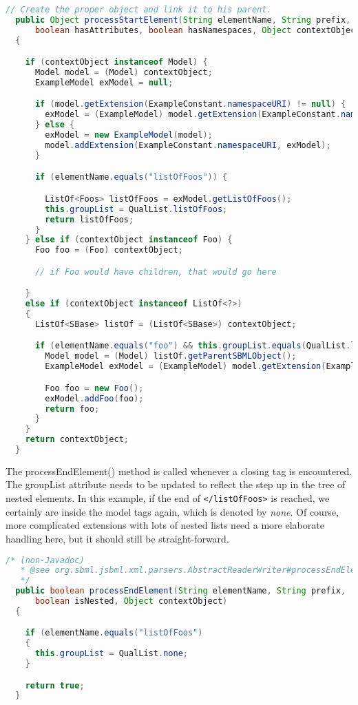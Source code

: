 \begin{lstlisting}[language=Java,caption={Extension parser: \texttt{processStartElement()}},label={lst:ModelExtParserStartElement}]
  // Create the proper object and link it to his parent.
  public Object processStartElement(String elementName, String prefix,
      boolean hasAttributes, boolean hasNamespaces, Object contextObject)
  {

    if (contextObject instanceof Model) {
      Model model = (Model) contextObject;
      ExampleModel exModel = null;

      if (model.getExtension(ExampleConstant.namespaceURI) != null) {
        exModel = (ExampleModel) model.getExtension(ExampleConstant.namespaceURI);
      } else {
        exModel = new ExampleModel(model);
        model.addExtension(ExampleConstant.namespaceURI, exModel);
      }

      if (elementName.equals("listOfFoos")) {

        ListOf<Foos> listOfFoos = exModel.getListOfFoos();
        this.groupList = QualList.listOfFoos;
        return listOfFoos;
      }
    } else if (contextObject instanceof Foo) {
      Foo foo = (Foo) contextObject;

      // if Foo would have children, that would go here

    }
    else if (contextObject instanceof ListOf<?>)
    {
      ListOf<SBase> listOf = (ListOf<SBase>) contextObject;

      if (elementName.equals("foo") && this.groupList.equals(QualList.listOfFoos)) {
        Model model = (Model) listOf.getParentSBMLObject();
        ExampleModel exModel = (ExampleModel) model.getExtension(ExampleConstant.namespaceURI);

        Foo foo = new Foo();
        exModel.addFoo(foo);
        return foo;
      }
    }
    return contextObject;
  }
\end{lstlisting}

The processEndElement() method is called whenever a closing tag is encountered.
The groupList attribute needs to be updated to reflect the step up in the tree of nested elements.
In this example, if the end of \texttt{</listOfFoos>} is reached, we certainly are inside the model tags again, which is denoted by \emph{none}.
Of course, more complicated extensions with lots of nested lists need a more elaborate handling here, but it should still be straight-forward.

\begin{lstlisting}[language=Java,caption={Extension parser: \texttt{processEndElement()}},label={lst:ModelExtParserEndElement}]
  /* (non-Javadoc)
   * @see org.sbml.jsbml.xml.parsers.AbstractReaderWriter#processEndElement(java.lang.String, java.lang.String, boolean, java.lang.Object)
   */
  public boolean processEndElement(String elementName, String prefix,
      boolean isNested, Object contextObject)
  {

    if (elementName.equals("listOfFoos")
    {
      this.groupList = QualList.none;
    }

    return true;
  }
\end{lstlisting}

